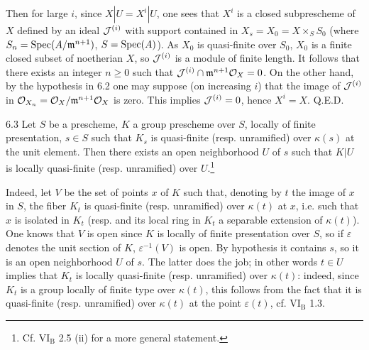 Then for large $i$, since $X|U=X^i|U$, one sees that $X^i$ is a closed subprescheme of $X$ defined by an ideal $\cal J^{(i)}$ with support contained in $X_s=X_0=X\times_S S_0$ (where $S_n=\Spec(A/\goth m^{n+1})$, $S=\Spec(A)$). As $X_0$ is quasi-finite over $S_0$, $X_0$ is a finite closed subset of noetherian $X$, so $\cal J^{(i)}$ is a module of finite length. It follows that there exists an integer $n\geq0$ such that $\cal J^{(i)}\cap\goth m^{n+1}\OX=0$. On the other hand, by the hypothesis in 6.2 one may suppose (on increasing $i$) that the image of $\cal J^{(i)}$ in $\OO_{X_n}=\OX/\goth m^{n+1}\OX$ is zero. This implies $\cal J^{(i)}=0$, hence $X^i=X$. \hfill Q.E.D.
\begin{lemma}{6.3}\label{IX.6.3}
Let $S$ be a prescheme, $K$ a group prescheme over $S$, locally of finite presentation, $s\in S$ such that $K_s$ is quasi-finite (resp. unramified) over $\kappa(s)$ at the unit element. Then there exists an open neighborhood $U$ of $s$ such that $K|U$ is locally quasi-finite (resp. unramified) over $U$.\footnote{Cf. VI$_{\mathrm B}$ 2.5 (ii) for a more general statement.}
\end{lemma}
Indeed, let $V$ be the set of points $x$ of $K$ such that, denoting by $t$ the image of $x$ in $S$, the fiber $K_t$ is quasi-finite (resp. unramified) over $\kappa(t)$ at $x$, i.e. such that $x$ is isolated in $K_t$ (resp. and its local ring in $K_t$ a separable extension of $\kappa(t)$). One knows that $V$ is open since $K$ is locally of finite presentation over $S$, so if $\varepsilon$ denotes the unit section of $K$, $\varepsilon^{-1}(V)$ is open. By hypothesis it contains $s$, so it is an open neighborhood $U$ of $s$. The latter does the job; in other words $t\in U$ implies that $K_t$ is locally quasi-finite (resp. unramified) over $\kappa(t)$: indeed, since $K_t$ is a group locally of finite type over $\kappa(t)$, this follows from the fact that it is quasi-finite (resp. unramified) over $\kappa(t)$ at the point $\varepsilon(t)$, cf. VI$_{\mathrm B}$ 1.3.

